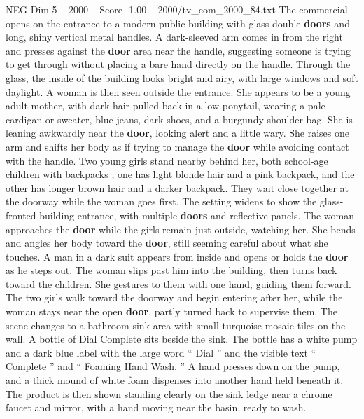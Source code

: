 \begin{textsample}{NEG Dim 5 – 2000 – Score -1.00 – 2000/tv\_com\_2000\_84.txt}  \label{ex:f5_neg_075}
The commercial opens on the entrance to a modern public building with glass double \textbf{doors} and long, shiny vertical metal handles.
A dark-sleeved arm comes in from the right and presses against the \textbf{door} area near the handle, suggesting someone is trying to get through without placing a bare hand directly on the handle.
Through the glass, the inside of the building looks bright and airy, with large windows and soft daylight.
A woman is then seen outside the entrance.
She appears to be a young adult mother, with dark hair pulled back in a low ponytail, wearing a pale cardigan or sweater, blue jeans, dark shoes, and a burgundy shoulder bag.
She is leaning awkwardly near the \textbf{door}, looking alert and a little wary.
She raises one arm and shifts her body as if trying to manage the \textbf{door} while avoiding contact with the handle.
Two young girls stand nearby behind her, both school-age children with backpacks ; one has light blonde hair and a pink backpack, and the other has longer brown hair and a darker backpack.
They wait close together at the doorway while the woman goes first.
The setting widens to show the glass-fronted building entrance, with multiple \textbf{doors} and reflective panels.
The woman approaches the \textbf{door} while the girls remain just outside, watching her.
She bends and angles her body toward the \textbf{door}, still seeming careful about what she touches.
A man in a dark suit appears from inside and opens or holds the \textbf{door} as he steps out.
The woman slips past him into the building, then turns back toward the children.
She gestures to them with one hand, guiding them forward.
The two girls walk toward the doorway and begin entering after her, while the woman stays near the open \textbf{door}, partly turned back to supervise them.
The scene changes to a bathroom sink area with small turquoise mosaic tiles on the wall.
A bottle of Dial Complete sits beside the sink.
The bottle has a white pump and a dark blue label with the large word “ Dial ” and the visible text “ Complete ” and “ Foaming Hand Wash. ” A hand presses down on the pump, and a thick mound of white foam dispenses into another hand held beneath it.
The product is then shown standing clearly on the sink ledge near a chrome faucet and mirror, with a hand moving near the basin, ready to wash.

\end{textsample}
